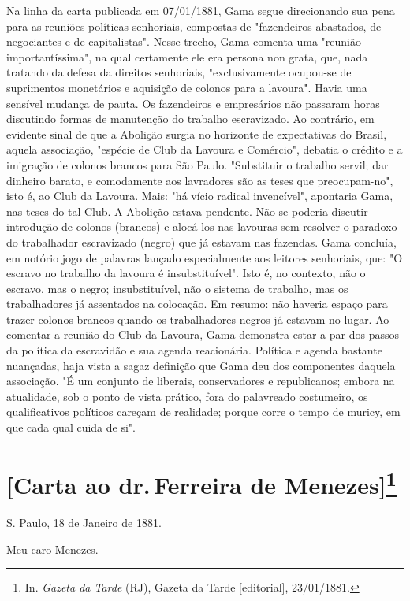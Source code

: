 {\small\noindent
Na linha da carta publicada em 07/01/1881, Gama segue direcionando
sua pena para as reuniões políticas senhoriais, compostas de
"fazendeiros abastados, de negociantes e de capitalistas". Nesse trecho,
Gama comenta uma "reunião importantíssima", na qual certamente ele era
persona non grata, que, nada tratando da defesa da direitos senhoriais,
"exclusivamente ocupou-se de suprimentos monetários e aquisição de
colonos para a lavoura". Havia uma sensível mudança de pauta. Os
fazendeiros e empresários não passaram horas discutindo formas de
manutenção do trabalho escravizado. Ao contrário, em evidente sinal de
que a Abolição surgia no horizonte de expectativas do Brasil, aquela
associação, "espécie de Club da Lavoura e Comércio", debatia o crédito e
a imigração de colonos brancos para São Paulo. "Substituir o trabalho
servil; dar dinheiro barato, e comodamente aos lavradores são as teses
que preocupam-no", isto é, ao Club da Lavoura. Mais: "há vício radical
invencível", apontaria Gama, nas teses do tal Club. A Abolição estava
pendente. Não se poderia discutir introdução de colonos (brancos) e
alocá-los nas lavouras sem resolver o paradoxo do trabalhador
escravizado (negro) que já estavam nas fazendas. Gama concluía, em
notório jogo de palavras lançado especialmente aos leitores senhoriais,
que: "O escravo no trabalho da lavoura é insubstituível". Isto é, no
contexto, não o escravo, mas o negro; insubstituível, não o sistema de
trabalho, mas os trabalhadores já assentados na colocação. Em resumo:
não haveria espaço para trazer colonos brancos quando os trabalhadores
negros já estavam no lugar. Ao comentar a reunião do Club da Lavoura,
Gama demonstra estar a par dos passos da política da escravidão e sua
agenda reacionária. Política e agenda bastante nuançadas, haja vista a
sagaz definição que Gama deu dos componentes daquela associação. "É um
conjunto de liberais, conservadores e republicanos; embora na
atualidade, sob o ponto de vista prático, fora do palavreado costumeiro,
os qualificativos políticos careçam de realidade; porque corre o tempo
de muricy, em que cada qual cuida de si".}

\chapter{{[}Carta ao dr.\,Ferreira de Menezes{]}\footnote[*]{In.
  \emph{Gazeta da Tarde} (RJ), Gazeta da Tarde {[}editorial{]},
  23/01/1881.}}

S. Paulo, 18 de Janeiro de 1881.

Meu caro Menezes.

